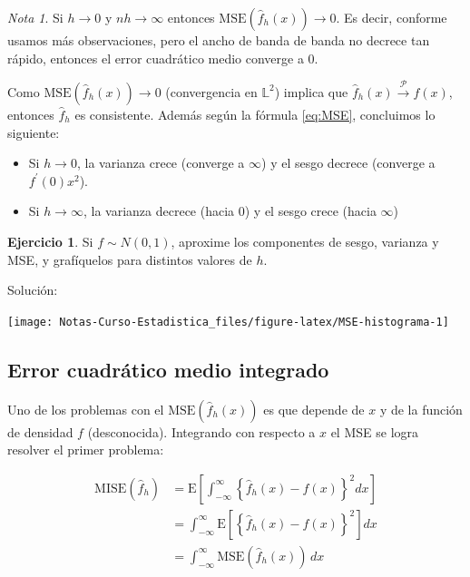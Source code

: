 \documentclass[
  12pt,
]{book}
\providecommand{\tightlist}{%
  \setlength{\itemsep}{0pt}\setlength{\parskip}{0pt}}
\theoremstyle{definition}
\theoremstyle{definition}
\theoremstyle{definition}
\newtheorem{exercise}{Ejercicio}[chapter]
\theoremstyle{definition}
\theoremstyle{remark}
\newtheorem*{remark}{Nota}
\begin{document}
\begin{remark}

Si \(h \to 0\) y \(nh \to \infty\) entonces \(\mathrm{MSE}\left( \hat{f}_h(x)\right) \to 0\). Es decir, conforme usamos más observaciones, pero el ancho de banda de banda no decrece tan rápido, entonces el error cuadrático medio converge a 0.

Como \(\mathrm{MSE}\left( \hat{f}_h(x)\right) \to 0\) (convergencia en \(\mathbb{L}^2\)) implica que \(\hat{f}_h(x) \stackrel{\mathcal{P}}{\to} f(x)\), entonces \(\hat{f}_h\) es consistente. Además según la fórmula \eqref{eq:MSE}, concluimos lo siguiente:

\begin{itemize}
\tightlist
\item
  Si \(h\to 0\), la varianza crece (converge a \(\infty\)) y el sesgo
  decrece (converge a \(f^\prime (0)x^2\)).
\item
  Si \(h\to \infty\), la varianza decrece (hacia 0) y el sesgo crece
  (hacia \(\infty\))
\end{itemize}

\end{remark}

\begin{exercise}
\protect\hypertarget{exr:unnamed-chunk-8}{}\label{exr:unnamed-chunk-8}Si \(f\sim N(0,1)\), aproxime los componentes de sesgo, varianza y MSE, y grafíquelos para distintos valores de \(h\).
\end{exercise}

Solución:

\begin{center}\texttt{[image: Notas-Curso-Estadistica\_files/figure-latex/MSE-histograma-1]} \end{center}

\hypertarget{error-cuadruxe1tico-medio-integrado}{%
\subsection{Error cuadrático medio integrado}\label{error-cuadruxe1tico-medio-integrado}}

Uno de los problemas con el \(\mathrm{MSE}\left( \hat{f}_h(x)\right)\) es que depende de \(x\) y de la función de densidad \(f\) (desconocida). Integrando con respecto a \(x\) el MSE se logra resolver el primer problema:

\begin{align*}
\mathrm{MISE}\left(  \hat{f}_h\right)
& = \mathrm{E}\left[
\int_{ -\infty}^{\infty} \left\{
\hat{f}_h(x) - f(x)
\right\}^2 dx
\right]                                                       \\
& = \int_{ -\infty}^{\infty} \mathrm{E}\left[
\left\{
\hat{f}_h(x) - f(x)
\right\}^2
\right] dx                                                    \\
& = \int_{ -\infty}^{\infty}\mathrm{MSE}(\hat{f}_h(x)) \, dx
\end{align*}
\end{document}
